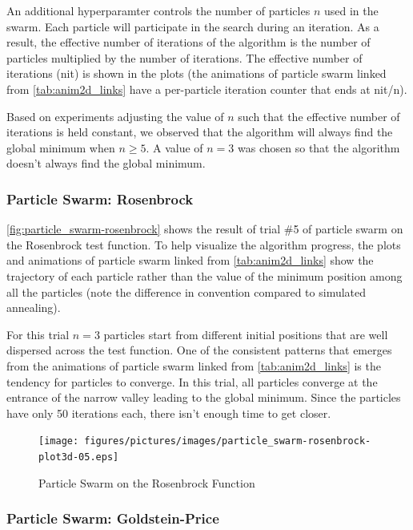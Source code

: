 \documentclass{vgtc}                          %
\begin{document}
An additional hyperparamter controls the number of particles $n$ used in the swarm.  Each particle will participate in the search during an iteration.  As a result, the effective number of iterations of the algorithm is the number of particles multiplied by the number of iterations.  The effective number of iterations (nit) is shown in the plots (the animations of particle swarm linked from \autoref{tab:anim2d_links} have a per-particle iteration counter that ends at nit/n).

Based on experiments adjusting the value of $n$ such that the effective number of iterations is held constant, we observed that the algorithm will always find the global minimum when $n \geq 5$.  A value of $n=3$ was chosen so that the algorithm doesn't always find the global minimum.

\subsubsection{Particle Swarm: Rosenbrock}

\autoref{fig:particle_swarm-rosenbrock} shows the result of trial \#5 of particle swarm on the Rosenbrock test function.  To help visualize the algorithm progress, the plots and animations of particle swarm linked from \autoref{tab:anim2d_links} show the trajectory of each particle rather than the value of the minimum position among all the particles (note the difference in convention compared to simulated annealing).

For this trial $n=3$ particles start from different initial positions that are well dispersed across the test function.  One of the consistent patterns that emerges from the animations of particle swarm linked from \autoref{tab:anim2d_links} is the tendency for particles to converge.  In this trial, all particles converge at the entrance of the narrow valley leading to the global minimum.  Since the particles have only 50 iterations each, there isn't enough time to get closer.

\begin{figure}[tb]
\centering
\texttt{[image: figures/pictures/images/particle\_swarm-rosenbrock-plot3d-05.eps]}
\caption{Particle Swarm on the Rosenbrock Function}
\label{fig:particle_swarm-rosenbrock}
\end{figure}

\subsubsection{Particle Swarm: Goldstein-Price}
\end{document}
